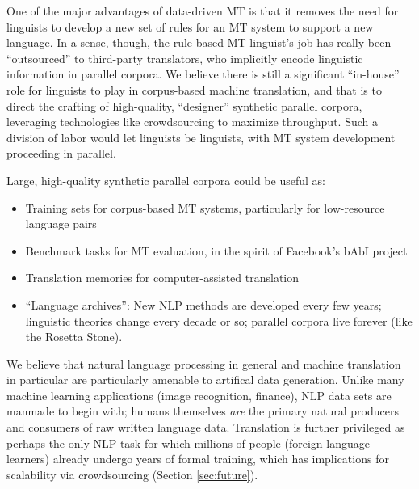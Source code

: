 %



One of the major advantages of data-driven MT is that it removes the need for linguists to develop a new set of rules for an MT system to support a new language.
In a sense, though, the rule-based MT linguist's job has really been  ``outsourced'' to third-party translators, who implicitly encode linguistic information in parallel corpora.
We believe there is still a significant ``in-house'' role for linguists to play in corpus-based machine translation, and that is to direct the crafting of high-quality, ``designer'' synthetic parallel corpora, leveraging technologies like crowdsourcing to maximize throughput.
Such a division of labor would let linguists be linguists, with MT system development proceeding in parallel.  


\label{subsec:benefits} %

Large, high-quality synthetic parallel corpora could be useful as:

\begin{itemize}
\item Training sets for corpus-based MT systems, particularly for low-resource language pairs
\item Benchmark tasks for MT evaluation, in the spirit of Facebook's bAbI project 
\item Translation memories for computer-assisted translation
\item ``Language archives'': New NLP methods are developed every few years; linguistic theories change every decade or so; parallel corpora live forever (like the Rosetta Stone).
\end{itemize}

We believe that natural language processing in general and machine translation in particular are particularly amenable to artifical data generation. 
Unlike many machine learning applications (image recognition, finance), NLP data sets are manmade to begin with; humans themselves {\em are} the primary natural producers and consumers of raw written language data.
Translation is further privileged as perhaps the only NLP task for which millions of people (foreign-language learners) already undergo years of formal training, which has implications for scalability via crowdsourcing (Section \ref{sec:future}).

